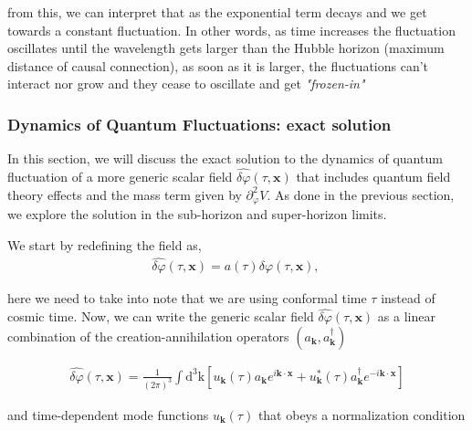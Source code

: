 \begin{itemize}
    from this, we can interpret that as the exponential term decays and we get towards a constant fluctuation. In other words, as time increases the fluctuation oscillates until the wavelength gets larger than the Hubble horizon
    (maximum distance of causal connection), as soon as it is larger, the fluctuations can't interact nor grow and they cease to oscillate and get \emph{"frozen-in"}
\end{itemize}


\subsubsection{Dynamics of Quantum Fluctuations: exact solution}

In this section, we will discuss the exact solution to the dynamics of quantum fluctuation of a more generic scalar field \(\hat{\delta \varphi}(\tau, \mathbf{x}) \)  that includes quantum field theory effects and the mass term given by $\partial_{\varphi}^{2} V$. As done in the previous section, we explore the solution in the sub-horizon and super-horizon limits.

We start by redefining the field as,
\begin{align}
    \hat{\delta \varphi}(\tau, \mathbf{x})=a(\tau) \delta \varphi(\tau, \mathbf{x}) ,\
\end{align}

here we need to take into note that we are using conformal time $\tau$  instead of cosmic time. Now, we can write the generic scalar field  $\hat{\delta \varphi}(\tau, \mathbf{x})$ as a linear combination of the creation-annihilation operators $\left(a_{\mathbf{k}}, a_{\mathbf{k}}^{\dagger}\right)$

\begin{align}
    \hat{\delta \varphi}(\tau, \mathbf{x})=\frac{1}{(2 \pi)^{3}} \int \mathrm{d}^{3} \mathrm{k}\left[u_{\mathbf{k}}(\tau) a_{\mathbf{k}} e^{i \mathbf{k} \cdot \mathbf{x}}+u_{\mathbf{k}}^{*}(\tau) a_{\mathbf{k}}^{\dagger} e^{-i \mathbf{k} \cdot \mathbf{x}}\right]
\end{align}

and time-dependent mode functions $u_{\mathbf{k}}(\tau)$ that obeys a normalization condition

